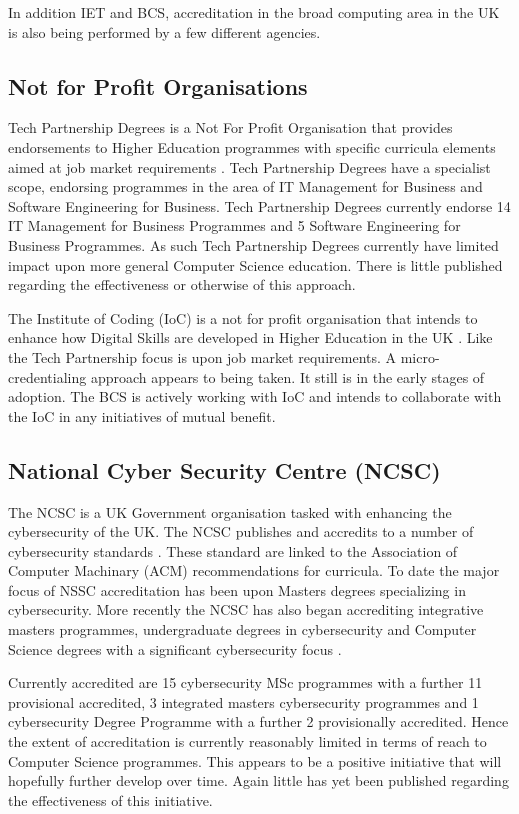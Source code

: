 \documentclass[sigconf]{acmart}
\begin{document}
In addition IET and BCS, accreditation in the broad computing area in the UK is also being performed by a few different agencies. 

\subsection{Not for Profit Organisations}
Tech Partnership Degrees is a Not For Profit Organisation that provides endorsements to Higher Education programmes with specific curricula elements aimed at job market requirements \cite{TP2019}. Tech Partnership Degrees have a specialist scope, endorsing programmes in the area of IT Management for Business and Software Engineering for Business.  Tech Partnership Degrees currently endorse 14 IT Management for Business Programmes and 5 Software Engineering for Business Programmes. As such Tech Partnership Degrees currently have limited impact upon more general Computer Science education. There is little published regarding the effectiveness or otherwise of this approach.

The Institute of Coding (IoC) is a not for profit organisation that intends to enhance how Digital Skills are developed in Higher Education in the UK \cite{Davenportetal2019a}. Like the Tech Partnership focus is upon job market requirements. A micro-credentialing approach appears to being taken. It still is in the early stages of adoption. The BCS is actively working with IoC and intends to collaborate with the IoC in any initiatives of mutual benefit.

\subsection{National Cyber Security Centre (NCSC)}
The NCSC is a UK Government organisation tasked with enhancing the cybersecurity of the UK. The NCSC publishes and accredits to a number of cybersecurity standards \cite{NCSC2018a}. These standard are linked to the Association of Computer Machinary (ACM) recommendations for curricula. To date the major focus of NSSC accreditation has been upon Masters degrees specializing in cybersecurity. More recently the NCSC has also began accrediting integrative masters programmes, undergraduate degrees in cybersecurity and Computer Science degrees with a significant cybersecurity focus \cite{NCSC2018b}.

Currently accredited are 15 cybersecurity MSc programmes with a further 11 provisional accredited, 3 integrated masters cybersecurity programmes and 1 cybersecurity Degree Programme with a further 2 provisionally accredited. Hence the extent of accreditation is currently reasonably limited in terms of reach to Computer Science programmes. This appears to be a positive initiative that will hopefully further develop over time. Again little has yet been published regarding the effectiveness of this initiative.
\end{document}
